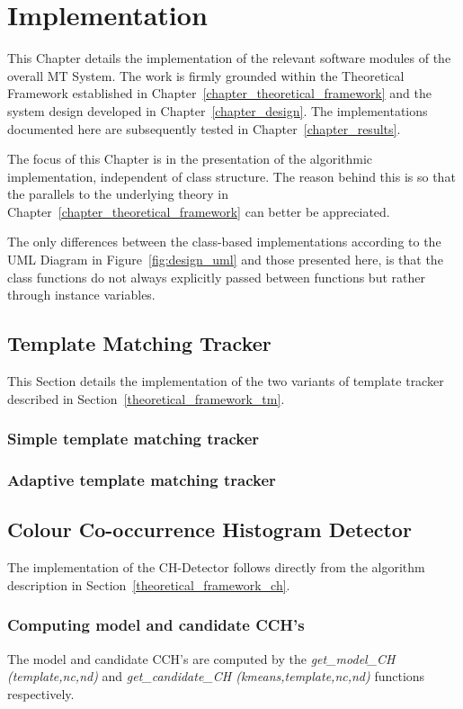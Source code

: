 \chapter{Implementation}\label{chapter_implementation}

This Chapter details the implementation of the relevant software modules of the
overall MT System. The work is firmly grounded within the Theoretical Framework
established in Chapter~\ref{chapter_theoretical_framework} and the system design
developed in Chapter~\ref{chapter_design}. The implementations documented here
are subsequently tested in Chapter~\ref{chapter_results}.

The focus of this Chapter is in the presentation of the algorithmic
implementation, independent of class structure. The reason behind this is so
that the parallels to the underlying theory in
Chapter~\ref{chapter_theoretical_framework} can better be appreciated.

The only differences between the class-based implementations according to the
UML Diagram in Figure~\ref{fig:design_uml} and those presented here, is that the
class functions do not always explicitly passed between functions but rather
through instance variables. 

\section{Template Matching Tracker}\label{implementation_tm}
This Section details the implementation of the two variants of template tracker
described in Section~\ref{theoretical_framework_tm}.

\subsection{Simple template matching tracker}

\subsection{Adaptive template matching tracker}


\section{Colour Co-occurrence Histogram Detector}\label{implementation_ch}
The implementation of the CH-Detector follows directly from the algorithm
description in Section~\ref{theoretical_framework_ch}.

\subsection{Computing model and candidate CCH's}
The model and candidate CCH's are computed by the \textit{get\_model\_CH
(template,nc,nd)} and \textit{get\_candidate\_CH (kmeans,template,nc,nd)}
functions respectively.

